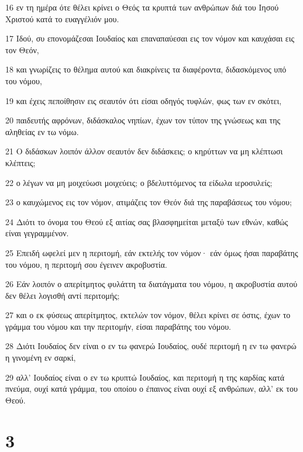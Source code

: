 \par 16 εν τη ημέρα ότε θέλει κρίνει ο Θεός τα κρυπτά των ανθρώπων διά του Ιησού Χριστού κατά το ευαγγέλιόν μου.
\par 17 Ιδού, συ επονομάζεσαι Ιουδαίος και επαναπαύεσαι εις τον νόμον και καυχάσαι εις τον Θεόν,
\par 18 και γνωρίζεις το θέλημα αυτού και διακρίνεις τα διαφέροντα, διδασκόμενος υπό του νόμου,
\par 19 και έχεις πεποίθησιν εις σεαυτόν ότι είσαι οδηγός τυφλών, φως των εν σκότει,
\par 20 παιδευτής αφρόνων, διδάσκαλος νηπίων, έχων τον τύπον της γνώσεως και της αληθείας εν τω νόμω.
\par 21 Ο διδάσκων λοιπόν άλλον σεαυτόν δεν διδάσκεις; ο κηρύττων να μη κλέπτωσι κλέπτεις;
\par 22 ο λέγων να μη μοιχεύωσι μοιχεύεις; ο βδελυττόμενος τα είδωλα ιεροσυλείς;
\par 23 ο καυχώμενος εις τον νόμον, ατιμάζεις τον Θεόν διά της παραβάσεως του νόμου;
\par 24 Διότι το όνομα του Θεού εξ αιτίας σας βλασφημείται μεταξύ των εθνών, καθώς είναι γεγραμμένον.
\par 25 Επειδή ωφελεί μεν η περιτομή, εάν εκτελής τον νόμον· εάν όμως ήσαι παραβάτης του νόμου, η περιτομή σου έγεινεν ακροβυστία.
\par 26 Εάν λοιπόν ο απερίτμητος φυλάττη τα διατάγματα του νόμου, η ακροβυστία αυτού δεν θέλει λογισθή αντί περιτομής;
\par 27 και ο εκ φύσεως απερίτμητος, εκτελών τον νόμον, θέλει κρίνει σε όστις, έχων το γράμμα του νόμου και την περιτομήν, είσαι παραβάτης του νόμου.
\par 28 Διότι Ιουδαίος δεν είναι ο εν τω φανερώ Ιουδαίος, ουδέ περιτομή η εν τω φανερώ η γινομένη εν σαρκί,
\par 29 αλλ' Ιουδαίος είναι ο εν τω κρυπτώ Ιουδαίος, και περιτομή η της καρδίας κατά πνεύμα, ουχί κατά γράμμα, του οποίου ο έπαινος είναι ουχί εξ ανθρώπων, αλλ' εκ του Θεού.

\chapter{3}

